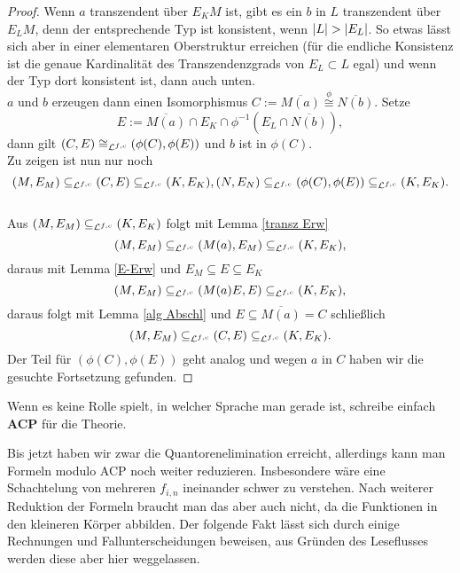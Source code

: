 \begin{proof}
    	Wenn $a$ transzendent über $E_KM$ ist, gibt es ein $b$ in $L$ transzendent über $E_LM$, denn der entsprechende Typ ist konsistent, wenn ${\left| L \right|}>{\left| E_L \right|}$. So etwas lässt sich aber in einer elementaren Oberstruktur erreichen (für die endliche Konsistenz ist die genaue Kardinalität des Transzendenzgrads von $E_L\subset L$ egal) und wenn der Typ dort konsistent ist, dann auch unten.\\
    	$a$ und $b$ erzeugen dann einen Isomorphismus $C:=\overline{M(a)}\overset{\phi}{\cong}\overline{N(b)}$. Setze $$E:=\overline{M(a)}\cap E_K\cap\phi^{-1}(E_L\cap\overline{N(b)}),$$ dann gilt $(C,E)\cong_{\mathcal{L}^{f,c}}(\phi(C),\phi(E))$ und $b$ ist in $\phi(C)$.\\
    	Zu zeigen ist nun nur noch $$(M,E_M)\subseteq_{\mathcal{L}^{f,c}}(C,E)\subseteq_{\mathcal{L}^{f,c}}(K,E_K),(N,E_N)\subseteq_{\mathcal{L}^{f,c}}(\phi(C),\phi(E))\subseteq_{\mathcal{L}^{f,c}}(K,E_K).$$\\
    	Aus $(M,E_M)\subseteq_{\mathcal{L}^{f,c}}(K,E_K)$ folgt mit Lemma \ref{transz Erw} $$(M,E_M)\subseteq_{\mathcal{L}^{f,c}}(M(a),E_M)\subseteq_{\mathcal{L}^{f,c}}(K,E_K),$$ daraus mit Lemma \ref{E-Erw} und $E_M\subseteq E\subseteq E_K$ $$(M,E_M)\subseteq_{\mathcal{L}^{f,c}}(M(a)E,E)\subseteq_{\mathcal{L}^{f,c}}(K,E_K),$$ daraus folgt mit Lemma \ref{alg Abschl} und $E\subseteq\overline{M(a)}=C$ schließlich $$(M,E_M)\subseteq_{\mathcal{L}^{f,c}}(C,E)\subseteq_{\mathcal{L}^{f,c}}(K,E_K).$$
    	Der Teil für $(\phi(C),\phi(E))$ geht analog und wegen $a$ in $C$ haben wir die gesuchte Fortsetzung gefunden.
    \end{proof}
    
    \newpage
    
    \begin{definition}
    	Wenn es keine Rolle spielt, in welcher Sprache man gerade ist, schreibe einfach \textbf{ACP} für die Theorie.
    \end{definition}
    
    Bis jetzt haben wir zwar die Quantorenelimination erreicht, allerdings kann man Formeln modulo ACP noch weiter reduzieren. Insbesondere wäre eine \glqq{}Schachtelung\grqq{} von mehreren $f_{i,n}$ ineinander schwer zu verstehen. Nach weiterer Reduktion der Formeln braucht man das aber auch nicht, da die Funktionen in den kleineren Körper abbilden. Der folgende Fakt lässt sich durch einige Rechnungen und Fallunterscheidungen beweisen, aus Gründen des Leseflusses werden diese aber hier weggelassen.
    

